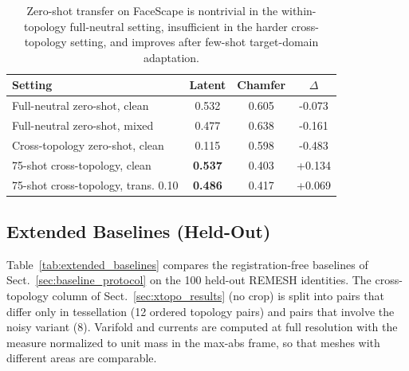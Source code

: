 \documentclass[10pt,twocolumn,letterpaper]{article}
\begin{document}
\begin{table}[!ht]
\centering
\footnotesize
\caption{Zero-shot transfer on FaceScape is nontrivial in the within-topology full-neutral setting, insufficient in the harder cross-topology setting, and improves after few-shot target-domain adaptation.}
\label{tab:faceverse_summary}
\begin{tabular}{lccc}
\toprule
Setting & Latent & Chamfer & $\Delta$ \\
\midrule
Full-neutral zero-shot, clean & 0.532 & 0.605 & -0.073 \\
Full-neutral zero-shot, mixed & 0.477 & 0.638 & -0.161 \\
Cross-topology zero-shot, clean & 0.115 & 0.598 & -0.483 \\
75-shot cross-topology, clean & \textbf{0.537} & 0.403 & +0.134 \\
75-shot cross-topology, trans. 0.10 & \textbf{0.486} & 0.417 & +0.069 \\
\bottomrule
\end{tabular}
\end{table}


\subsection{Extended Baselines (Held-Out)}
\label{sec:extended_baselines}
Table~\ref{tab:extended_baselines} compares the registration-free baselines of Sect.~\ref{sec:baseline_protocol} on the 100 held-out REMESH identities. The cross-topology column of Sect.~\ref{sec:xtopo_results} (no crop) is split into pairs that differ only in tessellation (12 ordered topology pairs) and pairs that involve the noisy variant (8). Varifold and currents are computed at full resolution with the measure normalized to unit mass in the max-abs frame, so that meshes with different areas are comparable.
\end{document}
